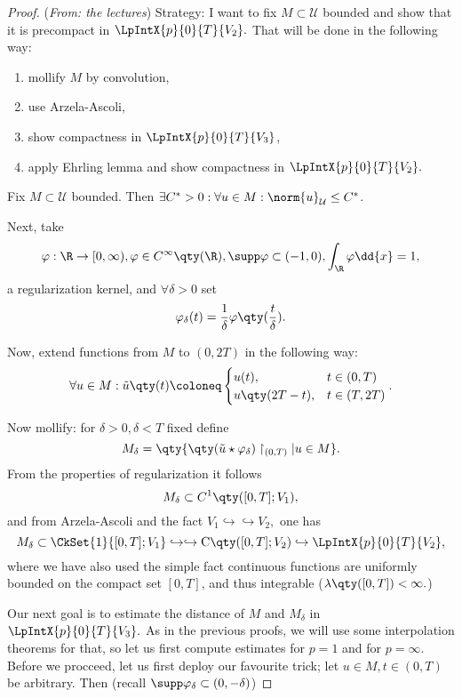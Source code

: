 \begin{proof}(\textit{From: the lectures})
	Strategy: I want to fix $M \subset \mathcal{U}$ bounded and show that it is precompact in $\LpIntX{p}{0}{T}{V_2}.$ That will be done in the following way:
	\begin{enumerate}
		\item mollify $M$ by convolution,
		\item use Arzela-Ascoli,
		\item show compactness in $\LpIntX{p}{0}{T}{V_3}$,
		\item apply Ehrling lemma and show compactness in $\LpIntX{p}{0}{T}{V_2}.$
	\end{enumerate}

	Fix $M \subset \mathcal{U}$ bounded. Then $\exists C^{*} > 0: \forall u \in M: \norm{u}_{\mathcal{U}} \leq C^{*}$. 

	Next, take
	\[
		\varphi : \R \to [0, \infty), \varphi \in C^{\infty}\qty(\R), \supp \varphi \subset (-1,0), \int_{\R}\varphi\dd{x} = 1,
	\]
	a regularization kernel, and $\forall \delta >0$ set
	\[
		\varphi_{\delta}(t) = \frac{1}{\delta}\varphi\qty(\frac{t}{\delta}).
	\]

	Now, extend functions from $M$ to $(0,2T)$ in the following way:
	\[
		\forall u \in M: \tilde{u}\qty(t) \coloneq \begin{cases}
			u(t), & t \in (0,T) \\
			u\qty(2T-t), & t \in (T,2T)
		\end{cases}.
	\]


	Now mollify: for $\delta >0, \delta <T $ fixed define
	\[
		M_{\delta} = \qty{\qty(\tilde{u} \star \varphi_{\delta})\restriction_{(0,T)} | u \in M}.
	\]
	From the properties of regularization it follows
	\[
		M_{\delta} \subset C^1\qty([0,T]; V_1),
	\]
	and from Arzela-Ascoli and the fact $V_1 \hookrightarrow \hookrightarrow V_2,$ one has
	\[
		M_{\delta} \subset \CkSet{1}{[0,T];V_1} \hookrightarrow \hookrightarrow \text{C}\qty([0,T];V_2) \hookrightarrow \LpIntX{p}{0}{T}{V_2},
	\]
	where we have also used the simple fact continuous functions are uniformly bounded on the compact set $[0,T]$, and thus integrable ($\lambda\qty([0,T]) < \infty.$)

	Our next goal is to estimate the distance of $M$ and $M_{\delta}$ in $\LpIntX{p}{0}{T}{V_3}.$ As in the previous proofs, we will use some interpolation theorems for that, so let us first compute estimates for $p = 1 $ and for $p = \infty.$ Before we procceed, let us first deploy our favourite trick; let $u \in M, t \in (0,T)$ be arbitrary. Then (recall $\supp \varphi_{\delta} \subset (0, - \delta)$)


\end{proof}
